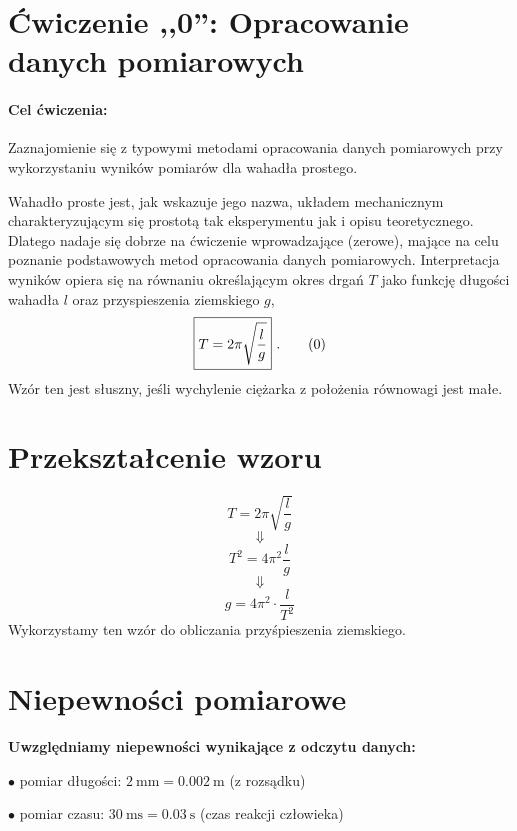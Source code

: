 \documentclass{fizykalab}
\begin{document}
\newpage

\section*{Ćwiczenie ,,0'': Opracowanie danych pomiarowych}
 {\setlength{\parindent}{0pt}
  \paragraph{Cel ćwiczenia:}
  Zaznajomienie się z typowymi metodami opracowania danych pomiarowych przy wykorzystaniu wyników pomiarów dla wahadła prostego.
  \newline

  \par
  Wahadło proste jest, jak wskazuje jego nazwa, układem mechanicznym charakteryzującym się prostotą tak eksperymentu jak i opisu teoretycznego. Dlatego nadaje się dobrze na ćwiczenie wprowadzające (zerowe), mające na celu poznanie podstawowych metod opracowania danych pomiarowych. Interpretacja wyników opiera się na równaniu określającym okres drgań $T$ jako funkcję długości wahadła $l$ oraz przyspieszenia ziemskiego $g$,
  \[\boxed{T = 2 \pi \sqrt{ \frac{l}{g} }}\text{\space.}\tag{0}\]
  Wzór ten jest słuszny, jeśli wychylenie ciężarka z położenia równowagi jest małe.
 }

\section*{Przekształcenie wzoru}
 {\setlength{\parindent}{0pt}
  \[ T = 2 \pi \sqrt{ \frac{l}{g} } \]
  \[\Downarrow\]
  \[ T^2 = 4 \pi^2 \frac{l}{g} \]
  \[\Downarrow\]
  \begin{equation}
	  \boxed{
		  g = 4\pi^2\cdot\frac{l}{T^2}
	  }
	  \tag{1}
  \end{equation}
  Wykorzystamy ten wzór do obliczania przyśpieszenia ziemskiego.
 }

\section*{Niepewności pomiarowe}
 {\setlength{\parindent}{0pt}
  \par
  \textbf{Uwzględniamy niepewności wynikające z odczytu danych:}

  $\bullet$ pomiar długości: $\SI{2}{\milli\meter} = \SI{0.002}{\meter}$ (z rozsądku)

  $\bullet$ pomiar czasu: $\SI{30}{\milli\second} = \SI{0.03}{\second}$ (czas reakcji człowieka)
 }
\end{document}
